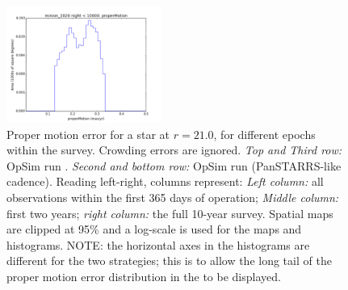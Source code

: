 \begin{figure}[ht]
\begin{center}
  \includegraphics[width=2.0in]{./figs/milkyway/astromPanels/MW_Astrom_pmError_PanSTARRS_10y_hst.png}
  \end{center}
  \caption{Proper motion error for a star at $r=21.0$, for different epochs within the survey. Crowding errors are ignored. {\it Top and Third row:} OpSim run . {\it Second and bottom row:} OpSim run  (PanSTARRS-like cadence). Reading left-right, columns represent: {\it Left column:} all observations within the first 365 days of operation; {\it Middle column:} first two years; {\it right column:} the full 10-year survey. Spatial maps are clipped at 95\% and a log-scale is used for the maps and histograms. NOTE: the horizontal axes in the histograms are different for the two strategies; this is to allow the long tail of the proper motion error distribution in the  to be displayed.}
  \label{fig_astrom_ByTime_pmError}
\end{figure}


